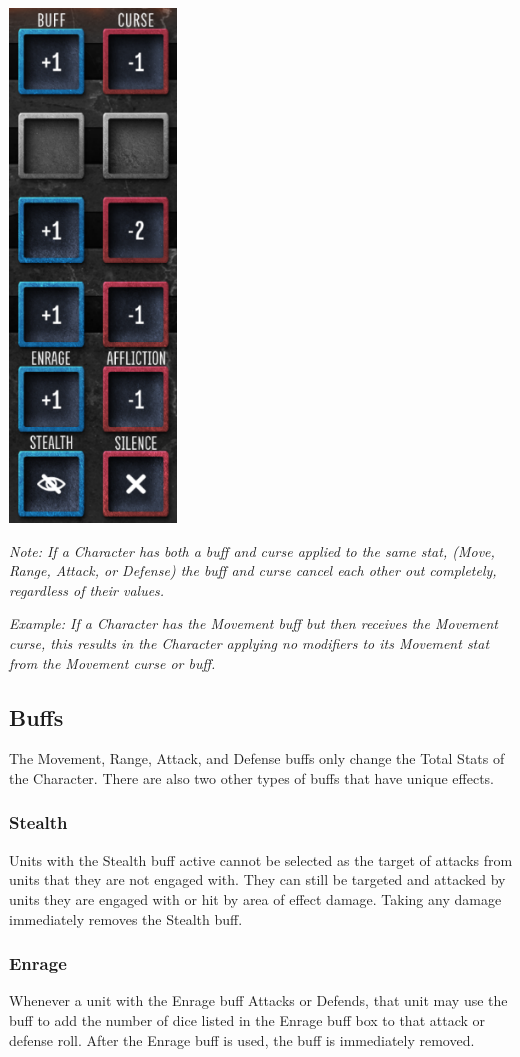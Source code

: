 \documentclass[../main.tex]{subfiles}
\begin{document}
\centering
\includegraphics[width=0.25\linewidth]{chapters//AdditionalCharacterInfo/TimeStrikeBuffsandCursesGraphic.png}

\textit{Note: If a Character has both a buff and curse applied to the same stat, (Move, Range, Attack, or Defense) the buff and curse cancel each other out completely, regardless of their values.}

\textit{Example: If a Character has the Movement buff but then receives the Movement curse, this results in the Character applying no modifiers to its Movement stat from the Movement curse or buff.}

\subsection{Buffs}
The Movement, Range, Attack, and Defense buffs only change the Total Stats of the Character. There are also two other types of buffs that have unique effects.

\subsubsection{Stealth}
Units with the Stealth buff active cannot be selected as the target of attacks from units that they are not engaged with. They can still be targeted and attacked by units they are engaged with or hit by area of effect damage. Taking any damage immediately removes the Stealth buff. 

\subsubsection{Enrage}
Whenever a unit with the Enrage buff Attacks or Defends, that unit may use the buff to add the number of dice listed in the Enrage buff box to that attack or defense roll. After the Enrage buff is used, the buff is immediately removed.
\end{document}
